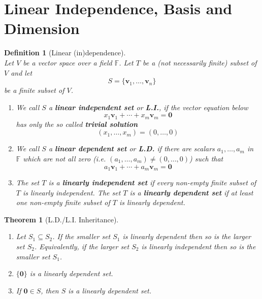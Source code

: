 \documentclass[12pt]{article}
\newtheorem{definition}{Definition}[section]
\newtheorem{theorem}{Theorem}[section]
\theoremstyle{definition}
\begin{document}
\section{Linear Independence, Basis and Dimension}
\begin{definition}[Linear (in)dependence]
\hfill\\\normalfont
Let $V$ be a vector space over a field $\mathbb{F}$. Let $T$ be a (not necessarily finite) subset of $V$ and let
\[
S=\{\mathbf{v}_1,\ldots,\mathbf{v}_n\}
\]
be a finite subset of $V$.
\begin{enumerate}[label=(\arabic*)]
\item We call $S$ a \textbf{linear independent set} or \textbf{L.I.}, if the vector equation below
\[
x_1\mathbf{v}_1+\cdots+x_m\mathbf{v}_m=\mathbf{0}
\]
has only the so called \textbf{trivial solution}
\[
(x_1,\ldots,x_m)=(0,\ldots,0)
\]
\item We call $S$ a \textbf{linear dependent set} or \textbf{L.D.} if there are scalars $a_1,\ldots,a_m$ in $\mathbb{F}$ which are not all zero (i.e. $(a_1,\ldots,a_m)\neq(0,\ldots,0)$) such that
\[
a_1\mathbf{v}_1+\cdots+a_m\mathbf{v}_m=\mathbf{0}
\]
\item The set $T$ is a \textbf{linearly independent set} if every non-empty finite subset of $T$ is linearly independent. The set $T$ is a \textbf{linearly dependent set} if at least one non-empty finite subset of $T$ is linearly dependent.
\end{enumerate}
\end{definition}
\begin{theorem}[L.D./L.I. Inheritance]
\hfill
\normalfont
\begin{enumerate}[label=(\arabic*)]
\item Let $S_1\subseteq S_2$. If the smaller set $S_1$ is linearly dependent then so is the larger set $S_2$. Equivalently, if the larger set $S_2$ is linearly independent then so is the smaller set $S_1$.
\item $\{\mathbf{0}\}$ is a linearly dependent set.
\item If $\mathbf{0}\in S$, then $S$ is a linearly dependent set.
\end{enumerate}
\end{theorem}
\end{document}
